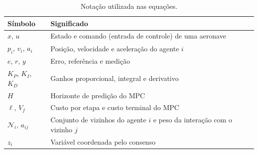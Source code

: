 \documentclass[11pt,a4paper,oneside]{book}
\numberwithin{equation}{chapter}
\begin{document}
\begin{table}[htbp]
\centering\small
\caption{Notação utilizada nas equações.}
\label{tab:notacao}
\begin{tabularx}{\textwidth}{@{}>{\raggedright\arraybackslash}p{2.4cm}Y@{}}
\toprule
Símbolo & Significado \\
\midrule
$x$, $u$ & Estado e comando (entrada de controle) de uma aeronave \\
$p_i$, $v_i$, $a_i$ & Posição, velocidade e aceleração do agente $i$ \\
$e$, $r$, $y$ & Erro, referência e medição \\
$K_P$, $K_I$, $K_D$ & Ganhos proporcional, integral e derivativo \\
$H$ & Horizonte de predição do MPC \\
$\ell$, $V_f$ & Custo por etapa e custo terminal do MPC \\
$\mathcal N_i$, $a_{ij}$ & Conjunto de vizinhos do agente $i$ e peso da interação com o vizinho $j$ \\
$z_i$ & Variável coordenada pelo consenso \\
\bottomrule
\end{tabularx}
\end{table}
\end{document}
